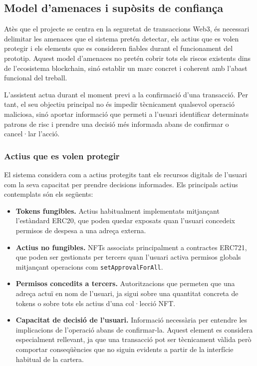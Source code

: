\subsection{Model d’amenaces i supòsits de confiança}
\label{sec:model_amenaces}

Atès que el projecte se centra en la seguretat de transaccions Web3, és necessari delimitar les amenaces que el sistema pretén detectar, els actius que es volen protegir i els elements que es consideren fiables durant el funcionament del prototip. Aquest model d’amenaces no pretén cobrir tots els riscos existents dins de l’ecosistema blockchain, sinó establir un marc concret i coherent amb l’abast funcional del treball.

L’assistent actua durant el moment previ a la confirmació d’una transacció. Per tant, el seu objectiu principal no és impedir tècnicament qualsevol operació maliciosa, sinó aportar informació que permeti a l’usuari identificar determinats patrons de risc i prendre una decisió més informada abans de confirmar o cancel·lar l’acció.

\subsubsection{Actius que es volen protegir}

El sistema considera com a actius protegits tant els recursos digitals de l’usuari com la seva capacitat per prendre decisions informades. Els principals actius contemplats són els següents:

\begin{itemize}
    \item \textbf{Tokens fungibles.} Actius habitualment implementats mitjançant l’estàndard ERC20, que poden quedar exposats quan l’usuari concedeix permisos de despesa a una adreça externa.

    \item \textbf{Actius no fungibles.} NFTs associats principalment a contractes ERC721, que poden ser gestionats per tercers quan l’usuari activa permisos globals mitjançant operacions com \texttt{setApprovalForAll}.

    \item \textbf{Permisos concedits a tercers.} Autoritzacions que permeten que una adreça actuï en nom de l’usuari, ja sigui sobre una quantitat concreta de tokens o sobre tots els actius d’una col·lecció NFT.

    \item \textbf{Capacitat de decisió de l’usuari.} Informació necessària per entendre les implicacions de l’operació abans de confirmar-la. Aquest element es considera especialment rellevant, ja que una transacció pot ser tècnicament vàlida però comportar conseqüències que no siguin evidents a partir de la interfície habitual de la cartera.
\end{itemize}

